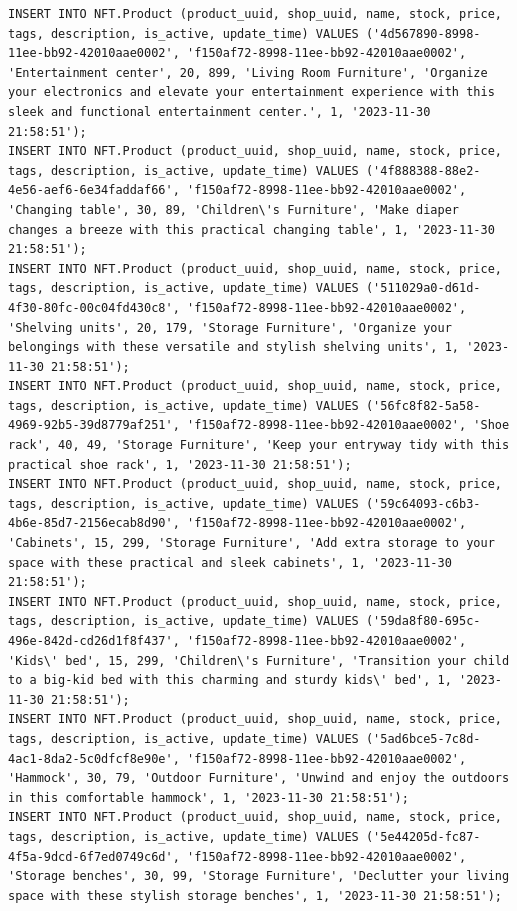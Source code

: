 \documentclass[a4paper, 12pt]{article}
\begin{document}
\begin{lstlisting}
INSERT INTO NFT.Product (product_uuid, shop_uuid, name, stock, price, tags, description, is_active, update_time) VALUES ('4d567890-8998-11ee-bb92-42010aae0002', 'f150af72-8998-11ee-bb92-42010aae0002', 'Entertainment center', 20, 899, 'Living Room Furniture', 'Organize your electronics and elevate your entertainment experience with this sleek and functional entertainment center.', 1, '2023-11-30 21:58:51');
INSERT INTO NFT.Product (product_uuid, shop_uuid, name, stock, price, tags, description, is_active, update_time) VALUES ('4f888388-88e2-4e56-aef6-6e34faddaf66', 'f150af72-8998-11ee-bb92-42010aae0002', 'Changing table', 30, 89, 'Children\'s Furniture', 'Make diaper changes a breeze with this practical changing table', 1, '2023-11-30 21:58:51');
INSERT INTO NFT.Product (product_uuid, shop_uuid, name, stock, price, tags, description, is_active, update_time) VALUES ('511029a0-d61d-4f30-80fc-00c04fd430c8', 'f150af72-8998-11ee-bb92-42010aae0002', 'Shelving units', 20, 179, 'Storage Furniture', 'Organize your belongings with these versatile and stylish shelving units', 1, '2023-11-30 21:58:51');
INSERT INTO NFT.Product (product_uuid, shop_uuid, name, stock, price, tags, description, is_active, update_time) VALUES ('56fc8f82-5a58-4969-92b5-39d8779af251', 'f150af72-8998-11ee-bb92-42010aae0002', 'Shoe rack', 40, 49, 'Storage Furniture', 'Keep your entryway tidy with this practical shoe rack', 1, '2023-11-30 21:58:51');
INSERT INTO NFT.Product (product_uuid, shop_uuid, name, stock, price, tags, description, is_active, update_time) VALUES ('59c64093-c6b3-4b6e-85d7-2156ecab8d90', 'f150af72-8998-11ee-bb92-42010aae0002', 'Cabinets', 15, 299, 'Storage Furniture', 'Add extra storage to your space with these practical and sleek cabinets', 1, '2023-11-30 21:58:51');
INSERT INTO NFT.Product (product_uuid, shop_uuid, name, stock, price, tags, description, is_active, update_time) VALUES ('59da8f80-695c-496e-842d-cd26d1f8f437', 'f150af72-8998-11ee-bb92-42010aae0002', 'Kids\' bed', 15, 299, 'Children\'s Furniture', 'Transition your child to a big-kid bed with this charming and sturdy kids\' bed', 1, '2023-11-30 21:58:51');
INSERT INTO NFT.Product (product_uuid, shop_uuid, name, stock, price, tags, description, is_active, update_time) VALUES ('5ad6bce5-7c8d-4ac1-8da2-5c0dfcf8e90e', 'f150af72-8998-11ee-bb92-42010aae0002', 'Hammock', 30, 79, 'Outdoor Furniture', 'Unwind and enjoy the outdoors in this comfortable hammock', 1, '2023-11-30 21:58:51');
INSERT INTO NFT.Product (product_uuid, shop_uuid, name, stock, price, tags, description, is_active, update_time) VALUES ('5e44205d-fc87-4f5a-9dcd-6f7ed0749c6d', 'f150af72-8998-11ee-bb92-42010aae0002', 'Storage benches', 30, 99, 'Storage Furniture', 'Declutter your living space with these stylish storage benches', 1, '2023-11-30 21:58:51');

\end{lstlisting}
\end{document}

